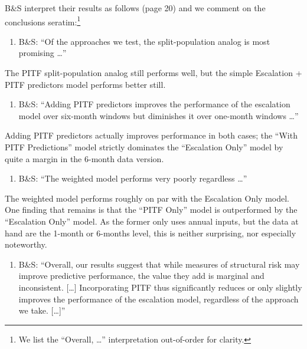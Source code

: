 \documentclass[
]{article}
\providecommand{\tightlist}{%
  \setlength{\itemsep}{0pt}\setlength{\parskip}{0pt}}
\begin{document}
B\&S interpret their results as follows (page 20) and we comment on the conclusions seratim:\footnote{We list the ``Overall, \ldots{}'' interpretation out-of-order for clarity.}

\begin{enumerate}
\def\labelenumi{\arabic{enumi}.}
\tightlist
\item
  B\&S: ``Of the approaches we test, the split-population analog is most promising \ldots{}''
\end{enumerate}

The PITF split-population analog still performs well, but the simple Escalation + PITF predictors model performs better still.

\begin{enumerate}
\def\labelenumi{\arabic{enumi}.}
\setcounter{enumi}{1}
\tightlist
\item
  B\&S: ``Adding PITF predictors improves the performance of the escalation model over six-month windows but diminishes it over one-month windows \ldots ''
\end{enumerate}

Adding PITF predictors actually improves performance in both cases; the ``With PITF Predictions'' model strictly dominates the ``Escalation Only'' model by quite a margin in the 6-month data version.

\begin{enumerate}
\def\labelenumi{\arabic{enumi}.}
\setcounter{enumi}{2}
\tightlist
\item
  B\&S: ``The weighted model performs very poorly regardless \ldots ''
\end{enumerate}

The weighted model performs roughly on par with the Escalation Only model. One finding that remains is that the ``PITF Only'' model is outperformed by the ``Escalation Only'' model. As the former only uses annual inputs, but the data at hand are the 1-month or 6-months level, this is neither surprising, nor especially noteworthy.

\begin{enumerate}
\def\labelenumi{\arabic{enumi}.}
\setcounter{enumi}{3}
\tightlist
\item
  B\&S: ``Overall, our results suggest that while measures of structural risk may improve predictive performance, the value they add is marginal and inconsistent. {[}\ldots{]} Incorporating PITF thus significantly reduces or only slightly improves the performance of the escalation model, regardless of the approach we take. {[}\ldots{]}''
\end{enumerate}
\end{document}

